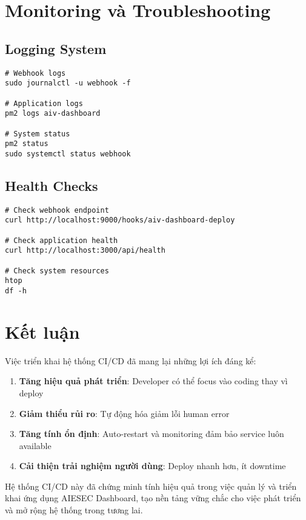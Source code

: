 \documentclass[12pt,a4paper]{article}
\begin{document}
\section{Monitoring và Troubleshooting}

\subsection{Logging System}

\begin{lstlisting}[caption=Các lệnh monitoring]
# Webhook logs
sudo journalctl -u webhook -f

# Application logs
pm2 logs aiv-dashboard

# System status
pm2 status
sudo systemctl status webhook
\end{lstlisting}

\subsection{Health Checks}

\begin{lstlisting}[caption=Các lệnh health check]
# Check webhook endpoint
curl http://localhost:9000/hooks/aiv-dashboard-deploy

# Check application health
curl http://localhost:3000/api/health

# Check system resources
htop
df -h
\end{lstlisting}

\section{Kết luận}

Việc triển khai hệ thống CI/CD đã mang lại những lợi ích đáng kể:

\begin{enumerate}
    \item \textbf{Tăng hiệu quả phát triển}: Developer có thể focus vào coding thay vì deploy
    \item \textbf{Giảm thiểu rủi ro}: Tự động hóa giảm lỗi human error
    \item \textbf{Tăng tính ổn định}: Auto-restart và monitoring đảm bảo service luôn available
    \item \textbf{Cải thiện trải nghiệm người dùng}: Deploy nhanh hơn, ít downtime
\end{enumerate}

Hệ thống CI/CD này đã chứng minh tính hiệu quả trong việc quản lý và triển khai ứng dụng AIESEC Dashboard, tạo nền tảng vững chắc cho việc phát triển và mở rộng hệ thống trong tương lai.
\end{document}

